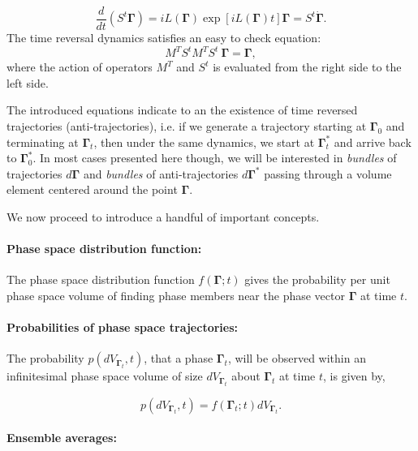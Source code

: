 \documentclass[a4paper,12pt]{article}
\begin{document}
\begin{equation}
\label{PhaseTimeDer}
  \frac{d}{dt}(S^t \bm{\Gamma})=iL(\bm{\Gamma})\exp[iL(\bm{\Gamma})t]\bm{\Gamma}=S^t \dot{\bm{\Gamma}}.
\end{equation}
The time reversal dynamics satisfies an easy to check equation:
\begin{equation}
  M^T S^t M^T S^t\ \bm{\Gamma} = \bm{\Gamma},
\end{equation}
where the action of operators $M^T$ and $S^t$ is evaluated from the right side to the left side. 

The introduced equations indicate to an the existence of time reversed trajectories (anti-trajectories), i.e. if we generate a trajectory starting at $\bm{\Gamma}_0$ and terminating at $\bm{\Gamma}_t$, then under the same dynamics, we start at $\bm{\Gamma}_t^*$ and arrive back to $\bm{\Gamma}_0^*$.
In most cases presented here though, we will be interested in \textit{bundles} of trajectories $d\bm{\Gamma}$ and \textit{bundles} of anti-trajectories $d\bm{\Gamma}^*$ passing through a volume element centered around the point $\bm{\Gamma}$.

We now proceed to introduce a handful of important concepts.

\paragraph{Phase space distribution function:}

The phase space distribution function $f(\bm{\Gamma};t)$ gives the probability per unit phase space volume of finding phase members near the phase vector $\bm{\Gamma}$ at time $t$.

\paragraph{Probabilities of phase space trajectories: }
The probability $p(d V_{\bm{\Gamma}_t},t)$, that a phase $\bm{\Gamma}_t$, will be observed within an infinitesimal phase space volume of size $d V_{\bm{\Gamma}_t}$ about $\bm{\Gamma}_t$ at time $t$, is given by,

\begin{equation}
  p(d V_{\bm{\Gamma}_t},t) = f(\bm{\Gamma}_t;t)d V_{\bm{\Gamma}_t}.
\end{equation}


\paragraph{Ensemble averages:}
\end{document}
